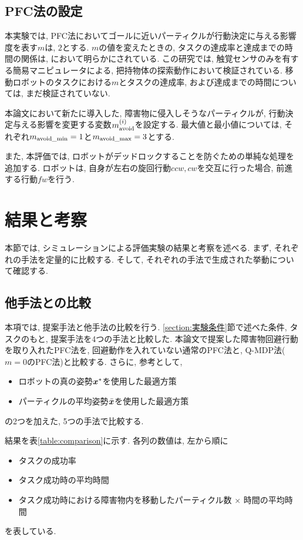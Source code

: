 \subsection{PFC法の設定}
本実験では, PFC法においてゴールに近いパーティクルが行動決定に与える影響度を表す$m$は, $2$とする. 
$m$の値を変えたときの, タスクの達成率と達成までの時間の関係は, \cite{ueda2018searching}において明らかにされている. 
この研究では, 触覚センサのみを有する簡易マニピュレータによる, 把持物体の探索動作において検証されている. 
移動ロボットのタスクにおける$m$とタスクの達成率, および達成までの時間については, まだ検証されていない. 

本論文において新たに導入した, 障害物に侵入しそうなパーティクルが, 行動決定与える影響を変更する変数$m^{(i)}_{\rm avoid}$を設定する. 
最大値と最小値については, それぞれ$m_{\rm avoid\_min} = 1$と$m_{\rm avoid\_max} = 3$とする. 

また, 本評価では, ロボットがデッドロックすることを防ぐための単純な処理を追加する. 
ロボットは, 自身が左右の旋回行動$ccw, cw$を交互に行った場合, 前進する行動$fw$を行う. 


\section{結果と考察} \label{section:結果}
本節では, シミュレーションによる評価実験の結果と考察を述べる. 
まず, それぞれの手法を定量的に比較する. 
そして, それぞれの手法で生成された挙動について確認する. 

\subsection{他手法との比較}
本項では, 提案手法と他手法の比較を行う. 
\ref{section:実験条件}節で述べた条件, タスクのもと, 提案手法を4つの手法と比較した. 
本論文で提案した障害物回避行動を取り入れたPFC法を, 
回避動作を入れていない通常のPFC法と, Q-MDP法($m=0$のPFC法)と比較する. 
さらに, 参考として, 
\begin{itemize}
  \item ロボットの真の姿勢$\boldsymbol{x}^{*}$を使用した最適方策
  \item パーティクルの平均姿勢$\bar{\boldsymbol{x}}$を使用した最適方策
\end{itemize}
の2つを加えた, 5つの手法で比較する. 

結果を表\ref{table:comparison}に示す. 
各列の数値は, 左から順に
\begin{itemize}
  \item タスクの成功率
  \item タスク成功時の平均時間
  \item タスク成功時における障害物内を移動したパーティクル数 $\times$ 時間の平均時間
\end{itemize}
を表している. 

